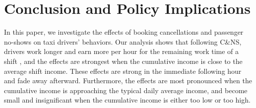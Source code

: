 \documentclass[reviewmode,AEJ]{AEA}
\begin{document}


\section{Conclusion and Policy Implications}
\label{sec:conclude}
In this paper, we investigate the effects of booking cancellations and passenger no-shows on taxi 
drivers' behaviors. Our analysis shows that following C\&NS, drivers work longer and earn more per hour
for the remaining work time of a shift%
, and the effects are strongest when the cumulative income is close to the average shift income. 
These effects are strong in the immediate following hour and fade away afterward. Furthermore, the effects are most pronounced when the cumulative income is approaching the typical daily average income, and become small and insignificant when the cumulative income is either too low or too high.
\end{document}
